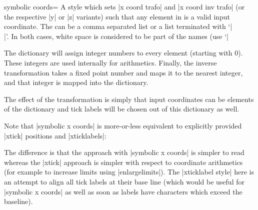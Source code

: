 \begin{pgfplotsxykeylist}{symbolic \x\space coords=}%
	A style which sets |x coord trafo| and |x coord inv trafo| (or the respective |y| or |z| variants) such that any element in  is a valid input coordinate. The  can be a comma separated list or a list terminated with `|\\|'. In both cases, white space is considered to be part of the names (use `|%

	The dictionary will assign integer numbers to every element (starting with $0$). These integers are used internally for arithmetics. Finally, the inverse transformation takes a fixed point number and maps it to the nearest integer, and that integer is mapped into the dictionary.
\begin{codeexample}[]
\end{codeexample}
	
	The effect of the transformation is simply that input coordinates can be elements of the dictionary and tick labels will be chosen out of this dictionary as well.

	Note that |symbolic x coords| is more-or-less equivalent to explicitly provided |xtick| positions and |xticklabels|:
\begin{codeexample}[]
\end{codeexample}
	\noindent The difference is that the approach with |symbolic x coords| is simpler to read whereas the |xtick| approach is simpler with respect to coordinate arithmetics (for example to increase limits using |enlargelimits|). The |xticklabel style| here is an attempt to align all tick labels at their base line (which would be useful for |symbolic x coords| as well as soon as labels have characters which exceed the baseline).



\end{pgfplotsxykeylist}
